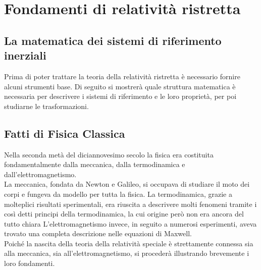 \documentclass[12pt,a4paper]{report}
\numberwithin{equation}{section}
\begin{document}
\begin{sloppypar}





\tableofcontents



\chapter{Fondamenti di relatività ristretta}

\section{La matematica dei sistemi di riferimento inerziali}
\label{sec:MathSDRI}
Prima di poter trattare la teoria della relatività ristretta è necessario fornire alcuni strumenti base. Di seguito si mostrerà quale struttura matematica è necessaria per descrivere i sistemi di riferimento e le loro proprietà, per poi studiarne le trasformazioni.



\section{Fatti di Fisica Classica}
Nella seconda metà del diciannovesimo secolo la fisica era costituita fondamentalmente dalla meccanica, 
dalla termodinamica e dall'elettromagnetismo.\\ La meccanica, fondata da Newton e Galileo, si occupava di studiare il 
moto dei corpi e fungeva da modello per tutta la fisica. La termodinamica, grazie a molteplici risultati sperimentali, era riuscita a descrivere molti fenomeni tramite i così detti principi della termodinamica, la cui origine però non era ancora del tutto chiara L'elettromagnetismo invece, in seguito 
a numerosi esperimenti, aveva trovato una completa descrizione nelle equazioni di Maxwell.\\
Poiché la nascita della teoria della relatività speciale è strettamente connessa sia alla meccanica, sia all'elettromagnetismo, si procederà illustrando brevemente i loro fondamenti. 






\end{sloppypar}
\end{document}
